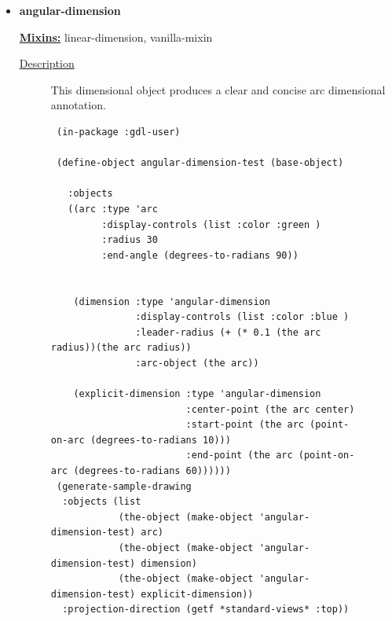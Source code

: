 \documentclass [11pt]{book}
\begin{document}
\begin{itemize}

\item {}
\label{prim:angular-dimension}
\textbf{angular-dimension}


\textbf{
\underline{Mixins:}} linear-dimension, vanilla-mixin





\begin{description}

\item [
\underline{Description}]


This dimensional object produces a clear and concise arc dimensional annotation.



\end{description}




\begin{figure}
\begin{lrbox}{\boxedverb}
\begin{minipage}{\linewidth}
{\small

\begin{verbatim}
 (in-package :gdl-user)

 (define-object angular-dimension-test (base-object) 
   
   :objects 
   ((arc :type 'arc
         :display-controls (list :color :green )
         :radius 30
         :end-angle (degrees-to-radians 90))
    
    
    (dimension :type 'angular-dimension
               :display-controls (list :color :blue )
               :leader-radius (+ (* 0.1 (the arc radius))(the arc radius))
               :arc-object (the arc))
    
    (explicit-dimension :type 'angular-dimension
                        :center-point (the arc center)
                        :start-point (the arc (point-on-arc (degrees-to-radians 10)))
                        :end-point (the arc (point-on-arc (degrees-to-radians 60))))))
 (generate-sample-drawing 
  :objects (list 
            (the-object (make-object 'angular-dimension-test) arc) 
            (the-object (make-object 'angular-dimension-test) dimension)
            (the-object (make-object 'angular-dimension-test) explicit-dimension))
  :projection-direction (getf *standard-views* :top))
 
  
\end{verbatim}}
\end{minipage}
\end{lrbox}
\fbox{\usebox{\boxedverb}}


\end{figure}
\end{itemize}
\end{document}
